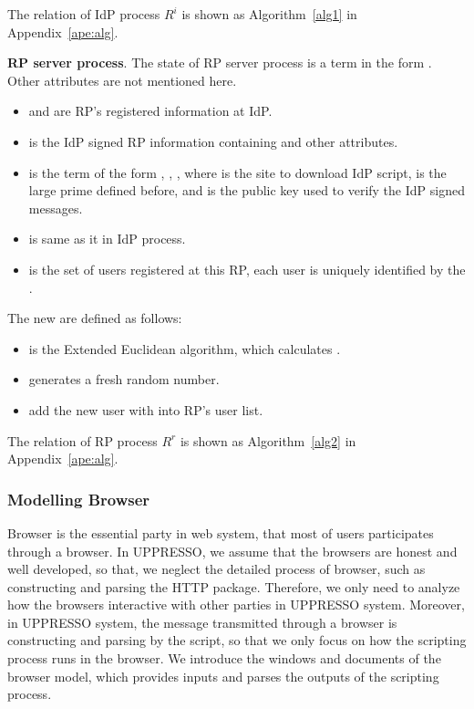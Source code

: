 The relation of IdP process $R^i$ is shown as Algorithm~\ref{alg1} in Appendix~\ref{ape:alg}.





\vspace{1mm}\noindent\textbf{RP server process}.
The state of RP server process is a term in the form . Other attributes are not mentioned here.
\begin{itemize}
\setlength\itemsep{-2pt}
\item {} and  are RP's registered information at IdP.
\item {} is the IdP signed RP information containing  and other attributes.
\item {} is the term of the form , , , where  is the site to download IdP script,  is the large prime defined before, and  is the public key used to verify the IdP signed messages.
\item {} is same as it in IdP process.
\item {} is the set of users registered at this RP, each user is uniquely identified by the .
\end{itemize}

The new  are defined as follows:
\begin{itemize}
\setlength\itemsep{-2pt}
 \item {} is the Extended Euclidean algorithm, which calculates  .
  \item {} generates a fresh random number.
  \item {} add the new user with  into RP's user list.
\end{itemize}
The relation of RP process $R^r$ is shown as Algorithm~\ref{alg2} in Appendix~\ref{ape:alg}.


\subsubsection{Modelling Browser}
Browser is the essential party in web system, that most of users participates through a browser.
In UPPRESSO, we assume that the browsers are honest and well developed, so that, we neglect  the detailed process of browser, such as constructing and parsing the HTTP package.
Therefore, we only need to analyze how the browsers interactive with other parties in UPPRESSO system.
Moreover, in UPPRESSO system, the message transmitted through a browser is constructing and parsing by the script, so that we only focus on how the scripting process runs in the browser.
We introduce the windows and documents of the browser model, which provides inputs and parses the outputs of the scripting process.

